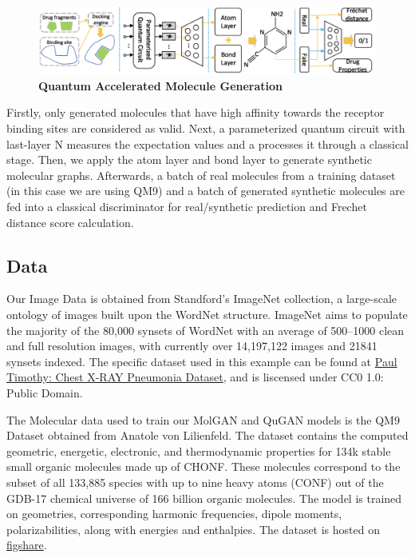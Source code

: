\documentclass{scrartcl}
\begin{document}
\begin{figure}[htbp]
\centering
\includegraphics[width=.9\linewidth]{./assets/quganflow.png}
\caption{\textbf{Quantum Accelerated Molecule Generation}}
\end{figure}

Firstly, only generated molecules that have high affinity towards the receptor binding sites are considered as valid. Next, a parameterized quantum circuit with last-layer N measures the expectation values and a processes it through a classical stage. Then, we apply the atom layer and bond layer to generate synthetic molecular graphs. Afterwards, a batch of real molecules from a training dataset (in this case we are using QM9) and a batch of generated synthetic molecules are fed into a classical discriminator for real/synthetic prediction and Frechet distance score calculation.

\subsection{Data}
\label{sec:org7dac6e2}

Our Image Data is obtained from Standford's ImageNet collection, a large-scale ontology of images built upon the WordNet structure. ImageNet aims to populate the majority of the 80,000 synsets of WordNet with an average of 500–1000 clean and full resolution images, with currently over 14,197,122 images and 21841 synsets indexed. The specific dataset used in this example can be found at \href{https://www.kaggle.com/paultimothymooney/chest-xray-pneumonia}{Paul Timothy: Chest X-RAY Pneumonia Dataset}, and is liscensed under CC0 1.0: Public Domain.

The Molecular data used to train our MolGAN and QuGAN models is the QM9 Dataset obtained from Anatole von Lilienfeld. The dataset contains the computed geometric, energetic, electronic, and thermodynamic properties for 134k stable small organic molecules made up of CHONF. These molecules correspond to the subset of all 133,885 species with up to nine heavy atoms (CONF) out of the GDB-17 chemical universe of 166 billion organic molecules. The model is trained on geometries, corresponding harmonic frequencies, dipole moments, polarizabilities, along with energies and enthalpies. The dataset is hosted on \href{https://doi.org/10.6084/m9.figshare.c.978904.v5}{figshare}.
\end{document}
